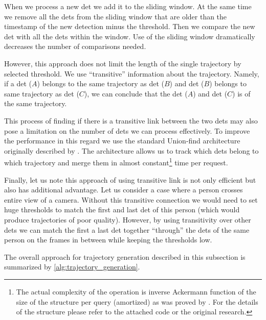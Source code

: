 When we process a new \gls{det} we add it to the sliding window. At the same time we remove all the \glspl{det} from the sliding window that are older than the timestamp of the new detection minus the threshold. Then we compare the new \gls{det} with all the \glspl{det} within the window. Use of the sliding window dramatically decreases the number of comparisons needed.

However, this approach does not limit the length of the single trajectory by selected threshold. We use ``transitive'' information about the trajectory. Namely, if a \gls{det} ($A$) belongs to the same trajectory as \gls{det} ($B$) and \gls{det} ($B$) belongs to same trajectory as \gls{det} ($C$), we can conclude that the \gls{det} ($A$) and \gls{det} ($C$) is of the same trajectory.

This process of finding if there is a transitive link between the two \glspl{det} may also pose a limitation on the number of \glspl{det} we can process effectively. To improve the performance in this regard we use the standard Union-find architecture originally described by \cite{galler1964improved}. The architecture allows us to track which \glspl{det} belong to which trajectory and merge them in almost constant\footnote{The actual complexity of the operation is inverse Ackermann function of the size of the structure per query (amortized) as was proved by \cite{tarjan1984worst}. For the details of the structure please refer to the attached code or the original research.} time per request.

Finally, let us note this approach of using transitive link is not only efficient but also has additional advantage. Let us consider a case where a person crosses entire view of a camera. Without this transitive connection we would need to set huge thresholds to match the first and last \gls{det} of this person (which would produce trajectories of poor quality). However, by using transitivity over other \glspl{det} we can match the first a last \gls{det} together ``through'' the \glspl{det} of the same person on the frames in between while keeping the thresholds low.

The overall approach for trajectory generation described in this subsection is summarized by \autoref{alg:trajectory_generation}.


